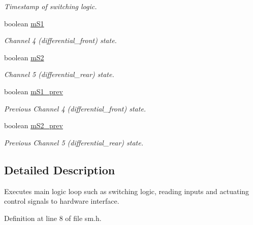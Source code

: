 \begin{DoxyCompactItemize}
\begin{DoxyCompactList}\small\item\em Timestamp of switching logic. \end{DoxyCompactList}\item 
boolean \hyperlink{classSPMB_1_1StateMachine_af37ba6ce3ef9826cd025a6259c42449d}{m\+S1}\hypertarget{classSPMB_1_1StateMachine_af37ba6ce3ef9826cd025a6259c42449d}{}\label{classSPMB_1_1StateMachine_af37ba6ce3ef9826cd025a6259c42449d}

\begin{DoxyCompactList}\small\item\em Channel 4 (differential\+\_\+front) state. \end{DoxyCompactList}\item 
boolean \hyperlink{classSPMB_1_1StateMachine_af7fcd1aec80eb5b7397b163db2e7c2ed}{m\+S2}\hypertarget{classSPMB_1_1StateMachine_af7fcd1aec80eb5b7397b163db2e7c2ed}{}\label{classSPMB_1_1StateMachine_af7fcd1aec80eb5b7397b163db2e7c2ed}

\begin{DoxyCompactList}\small\item\em Channel 5 (differential\+\_\+rear) state. \end{DoxyCompactList}\item 
boolean \hyperlink{classSPMB_1_1StateMachine_af6ffc5aa94ef7f423d217f8fba9cb998}{m\+S1\+\_\+prev}\hypertarget{classSPMB_1_1StateMachine_af6ffc5aa94ef7f423d217f8fba9cb998}{}\label{classSPMB_1_1StateMachine_af6ffc5aa94ef7f423d217f8fba9cb998}

\begin{DoxyCompactList}\small\item\em Previous Channel 4 (differential\+\_\+front) state. \end{DoxyCompactList}\item 
boolean \hyperlink{classSPMB_1_1StateMachine_a1d0a5cbe9d61f50e3d0ac3bdca99b936}{m\+S2\+\_\+prev}\hypertarget{classSPMB_1_1StateMachine_a1d0a5cbe9d61f50e3d0ac3bdca99b936}{}\label{classSPMB_1_1StateMachine_a1d0a5cbe9d61f50e3d0ac3bdca99b936}

\begin{DoxyCompactList}\small\item\em Previous Channel 5 (differential\+\_\+rear) state. \end{DoxyCompactList}\end{DoxyCompactItemize}


\subsection{Detailed Description}
Executes main logic loop such as switching logic, reading inputs and actuating control signals to hardware interface. 

Definition at line 8 of file sm.\+h.

